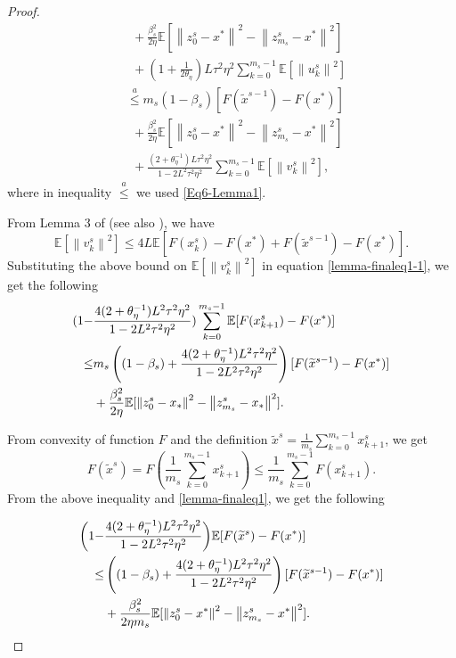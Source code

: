 \documentclass[conference]{IEEEtran}
\newcommand*{\E}{\mathbb{E}}
\newcommand{\norm}[1]{\left\lVert#1\right\rVert}
\theoremstyle{definition}
\theoremstyle{remark}
\begin{document}
\begin{proof}
\begin{equation}
\begin{split}
&~~+ {\frac{ \beta_s^2}{2\eta}}\E[\norm{z_{0}^s-x^*}^2-\norm{z_{m_s}^s-x^*}^2]\\
&~~+(1+\frac{1}{2\theta_{\eta}})L\tau^2\eta^2\sum_{k=0}^{m_s-1}\E[\norm{u_{k}^s}^2]\\
&\stackrel{a}{\leq} m_s(1-\beta_s)[F(\widetilde{x}^{s-1})-F(x^*)] \\
&~~+ {\frac{ \beta_s^2}{2\eta}}\E[\norm{z_{0}^s-x^*}^2-\norm{z_{m_s}^s-x^*}^2]\\
&~~+\frac{(2+\theta_{\eta}^{-1})L\tau^2\eta^2}{1-2L^2 \tau^2\eta^2}\sum_{k=0}^{m_s-1}\E[\norm{v^s_k}^2],
\end{split}
\end{equation}
where in inequality $\stackrel{a}{\leq}$ we used \eqref{Eq6-Lemma1}.


From Lemma 3 of \cite{Johnson12} (see also \cite{Reddi2015}), we have 
\[
\E[\norm{v^s_k}^2] \leq 4L \E[F(x_k^s)-F(x^*)+F(\widetilde{x}^{s-1})-F(x^*)].
\]
Substituting the above bound on $\E[\norm{v^s_k}^2]$ in equation \eqref{lemma-finaleq1-1}, we get the following
\begin{gather}\label{lemma-finaleq1}
\begin{split}
(1-&\frac{4(2+\theta_{\eta}^{-1})L^2\tau^2\eta^2}{1-2L^2 \tau^2\eta^2})\sum_{k=0}^{m_s-1}\E[F(x_{k+1}^s)-F(x^*)]\\ 
\leq &m_s\left((1-\beta_s)+\frac{4(2+\theta_{\eta}^{-1})L^2\tau^2\eta^2}{1-2L^2 \tau^2\eta^2}\right)[F(\widetilde{x}^{s-1})-F(x^*)] \\
&+ {\frac{ \beta_s^2}{2\eta}}\E[\norm{z_{0}^s-x_*}^2-\norm{z_{m_s}^s-x_*}^2].
\end{split}
\raisetag{15pt}
\end{gather}

From convexity of function $F$ and the definition $\widetilde{x}^s = \frac{1}{m_s}\sum_{k=0}^{m_s-1}x_{k+1}^s$, we get 
\[
F(\widetilde{x}^s) = F(\frac{1}{m_s}\sum_{k=0}^{m_s-1} x_{k+1}^s)\leq \frac{1}{m_s}\sum_{k=0}^{m_s-1}F(x_{k+1}^s).
\]
From the above inequality and \eqref{lemma-finaleq1}, we get the following

\begin{gather}
\begin{split}
\bigg(1-&\frac{4(2+\theta_{\eta}^{-1})L^2\tau^2\eta^2}{1-2L^2 \tau^2\eta^2}\bigg)\E[F(\widetilde{x}^s)-F(x^*)]\\ 
\leq &\left((1-\beta_s)+\frac{4(2+\theta_{\eta}^{-1})L^2\tau^2\eta^2}{1-2L^2 \tau^2\eta^2}\right)[F(\widetilde{x}^{s-1})-F(x^*)] \\
&+ {\frac{\beta_s^2}{2\eta m_s}}\E[\norm{z_{0}^s-x^*}^2-\norm{z_{m_s}^s-x^*}^2].
\end{split}
\raisetag{20pt}
\end{gather}
\end{proof}

%
%
\end{document}
